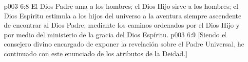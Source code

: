 \vs p003 6:8 \pc El Dios Padre ama a los hombres; el Dios Hijo sirve a los hombres; el Dios Espíritu estimula a los hijos del universo a la aventura siempre ascendente de encontrar al Dios Padre, mediante los caminos ordenados por el Dios Hijo y por medio del ministerio de la gracia del Dios Espíritu.
\vsetoff
\vs p003 6:9 [Siendo el consejero divino encargado de exponer la revelación sobre el Padre Universal, he continuado con este enunciado de los atributos de la Deidad.]
